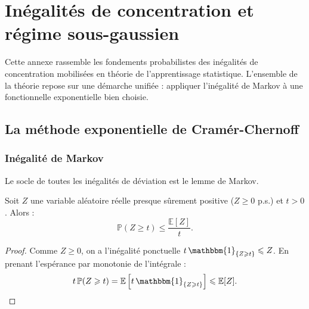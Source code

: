 
\chapter{Inégalités de concentration et régime sous-gaussien}

\minitoc 

Cette annexe rassemble les fondements probabilistes des inégalités de concentration mobilisées en théorie de l'apprentissage statistique. L'ensemble de la théorie repose sur une démarche unifiée : appliquer l'inégalité de Markov à une fonctionnelle exponentielle bien choisie.


\section{La méthode exponentielle de Cramér-Chernoff}

\subsection{Inégalité de Markov}

Le socle de toutes les inégalités de déviation est le lemme de Markov.

\begin{theorem}
    Soit $Z$ une variable aléatoire réelle presque sûrement positive ($Z \geqslant 0$ p.s.) et $t > 0$. Alors :
    \begin{equation}
        \mathbb{P}(Z \geqslant t) \leqslant \frac{\mathbb{E}[Z]}{t}.
    \end{equation}
\end{theorem}

\begin{proof}
    Comme $Z \geqslant 0$, on a l'inégalité ponctuelle $t \, \mathbbm{1}_{\{Z \geqslant t\}} \leqslant Z$. En prenant l'espérance par monotonie de l'intégrale :
    \begin{equation*}
        t \, \mathbb{P}(Z \geqslant t) = \mathbb{E}\left[ t \, \mathbbm{1}_{\{Z \geqslant t\}} \right] \leqslant \mathbb{E}[Z].
    \end{equation*}
\end{proof}

